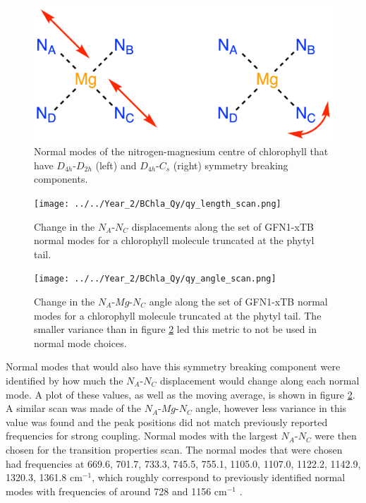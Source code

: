 \begin{figure}
    \centering
    \includegraphics[scale=1.5]{chapters/4_chl_xtb/D4h_symmetry.png}
    \caption{Normal modes of the nitrogen-magnesium centre of chlorophyll that have
    $D_{4h}$-$D_{2h}$ (left) and $D_{4h}$-$C_{s}$ (right) symmetry breaking components.}
    \label{fig:D4_sym_breaking}
\end{figure}

\begin{figure}
    \centering
    \texttt{[image: ../../Year\_2/BChla\_Qy/qy\_length\_scan.png]}
    \caption{Change in the $N_A$-$N_C$ displacements along the set of GFN1-xTB 
    normal modes for a chlorophyll molecule truncated at the phytyl tail.}
    \label{fig:qy_length_scan}
\end{figure}

\begin{figure}
    \centering
    \texttt{[image: ../../Year\_2/BChla\_Qy/qy\_angle\_scan.png]}
    \caption{Change in the $N_A$-$Mg$-$N_C$ angle along the set of GFN1-xTB normal
    modes for a chlorophyll molecule truncated at the phytyl tail. The smaller variance
    than in figure \ref{fig:qy_length_scan} led this metric to not be used in normal
    mode choices.}
    \label{fig:qy_angle_scan}
\end{figure}

Normal modes that would also have this symmetry breaking component were identified
by how much the $N_A$-$N_C$ displacement would change along each normal mode. A plot of these
values, as well as the moving average, is shown in figure \ref{fig:qy_length_scan}.
A similar scan was made of the $N_A$-$Mg$-$N_C$ angle, however less variance in
this value was found and the peak positions did not match previously reported frequencies
for strong coupling. Normal modes with the largest $N_A$-$N_C$ were then chosen 
for the transition properties scan. The normal modes that were chosen had frequencies 
at 669.6, 701.7, 733.3, 745.5, 755.1, 1105.0, 1107.0, 1122.2, 1142.9, 1320.3, 1361.8 
$\text{cm}^{-1}$, which roughly correspond to previously identified normal modes
with frequencies of around 728 and 1156 $\text{cm}^{-1}$ \cite{Kim2020}.

